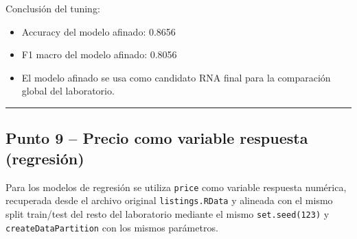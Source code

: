 \documentclass[
]{article}
\providecommand{\tightlist}{%
  \setlength{\itemsep}{0pt}\setlength{\parskip}{0pt}}
\begin{document}
Conclusión del tuning:

\begin{itemize}
\tightlist
\item
  Accuracy del modelo afinado: 0.8656
\item
  F1 macro del modelo afinado: 0.8056
\item
  El modelo afinado se usa como candidato RNA final para la comparación
  global del laboratorio.
\end{itemize}

\begin{center}\rule{0.5\linewidth}{0.5pt}\end{center}

\hypertarget{punto-9-precio-como-variable-respuesta-regresiuxf3n}{%
\subsection{Punto 9 -- Precio como variable respuesta
(regresión)}\label{punto-9-precio-como-variable-respuesta-regresiuxf3n}}

Para los modelos de regresión se utiliza \texttt{price} como variable
respuesta numérica, recuperada desde el archivo original
\texttt{listings.RData} y alineada con el mismo split train/test del
resto del laboratorio mediante el mismo \texttt{set.seed(123)} y
\texttt{createDataPartition} con los mismos parámetros.
\end{document}
